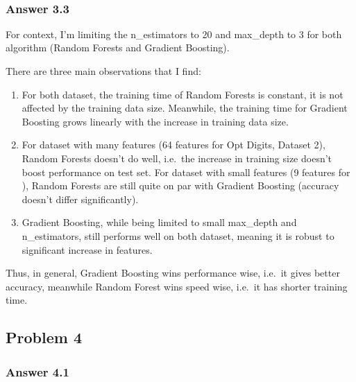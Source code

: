 \documentclass[11pt]{article}
\begin{document}
    \begin{center}
    \end{center}
    { \hspace*{\fill} \\}
    
    \hypertarget{answer-3.3}{%
\subsubsection{Answer 3.3}\label{answer-3.3}}

    For context, I'm limiting the n\_estimators to 20 and max\_depth to 3
for both algorithm (Random Forests and Gradient Boosting).

There are three main observations that I find:

\begin{enumerate}
\def\labelenumi{\arabic{enumi}.}
\item
  For both dataset, the training time of Random Forests is constant, it
  is not affected by the training data size. Meanwhile, the training
  time for Gradient Boosting grows linearly with the increase in
  training data size.
\item
  For dataset with many features (64 features for Opt Digits, Dataset
  2), Random Forests doesn't do well, i.e.~the increase in training size
  doesn't boost performance on test set. For dataset with small features
  (9 features for ), Random Forests are still quite on par with Gradient
  Boosting (accuracy doesn't differ significantly).
\item
  Gradient Boosting, while being limited to small max\_depth and
  n\_estimators, still performs well on both dataset, meaning it is
  robust to significant increase in features.
\end{enumerate}

Thus, in general, Gradient Boosting wins performance wise, i.e.~it gives
better accuracy, meanwhile Random Forest wins speed wise, i.e.~it has
shorter training time.

    \hypertarget{problem-4}{%
\subsection{Problem 4}\label{problem-4}}

    \hypertarget{answer-4.1}{%
\subsubsection{Answer 4.1}\label{answer-4.1}}
\end{document}
